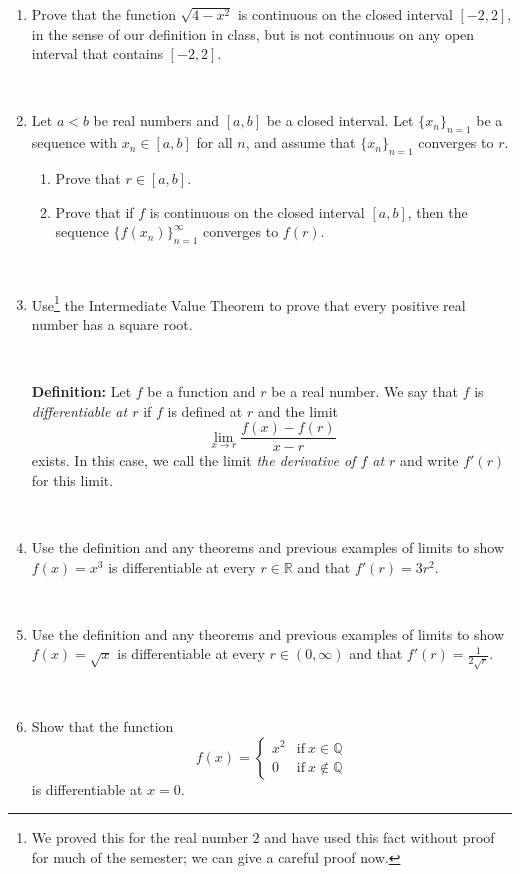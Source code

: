 \documentclass{amsart}
\def\R{\mathbb R}
\def\Q{\mathbb Q}
\def\ds{\displaystyle}
\begin{document}
\begin{enumerate}

\item Prove that the function $\sqrt{4-x^2}$ is continuous on the closed interval $[-2,2]$, in the sense of our definition in class, but is not continuous on any open interval that contains $[-2,2]$.

\

\item Let $a<b$ be real numbers and $[a,b]$ be a closed interval. Let $\{x_n\}_{n=1}$ be a sequence with $x_n\in[a,b]$ for all $n$, and assume that $\{x_n\}_{n=1}$ converges to $r$.
\begin{enumerate}
\item Prove that $r\in [a,b]$.
\item Prove that if $f$ is continuous on the closed interval $[a,b]$, then the sequence $\{f(x_n)\}_{n=1}^\infty$ converges to $f(r)$.
\end{enumerate}

\

\item Use\footnote{We proved this for the real number $2$ and have used this fact without proof for much of the semester; we can give a careful proof now.}  the Intermediate Value Theorem to prove that every positive real number has a square root.


\

\begin{framed}
\noindent \textbf{Definition:} Let $f$ be a function and $r$ be a real number. We say that $f$ is \emph{differentiable at $r$} if $f$ is defined at $r$ and the limit
\[ \lim_{x\to r} \frac{ f(x) - f(r) }{x-r}\]
exists. In this case, we call the limit \emph{the derivative of $f$ at $r$} and write $f'(r)$ for this limit.
\end{framed}

\

\item Use the definition and any theorems and previous examples of limits to show $f(x)= x^3$  is differentiable at every $r\in \R$ and that $f'(r) = 3r^2$.

\

\item Use the definition and any theorems and previous examples of limits to show $f(x)= \sqrt{x}$  is differentiable at every $r\in (0,\infty)$ and that $\ds f'(r) = \frac{1}{2\sqrt{r}}$.

\


\item Show that the function 
\[ f(x) = \begin{cases} x^2 & \text{if} \ x\in \Q \\ 0 & \text{if} \ x\notin \Q\end{cases} \]
is differentiable at $x=0$.

\end{enumerate}
\end{document}
